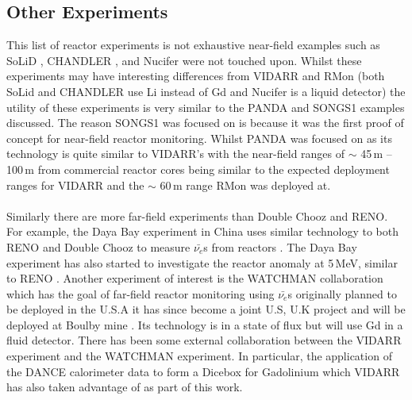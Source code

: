 \subsection{Other Experiments}
This list of reactor experiments is not exhaustive near-field examples such as SoLiD \cite{Solid_readout}, CHANDLER \cite{aap2015}, and Nucifer \cite{nucifer2016} were not touched upon. Whilst these experiments may have interesting differences from VIDARR and RMon (both SoLid and CHANDLER use Li instead of Gd and Nucifer is a liquid detector) the utility of these experiments is very similar to the PANDA and SONGS1 examples discussed. The reason SONGS1 was focused on is because it was the first proof of concept for near-field reactor monitoring. Whilst PANDA was focused on as its technology is quite similar to VIDARR's with the near-field ranges of $\sim$ 45\,m -- 100\,m from commercial reactor cores being similar to the expected deployment ranges for VIDARR and the $\sim$ 60\,m range RMon was deployed at. 
\\\\Similarly there are more far-field experiments than Double Chooz and RENO. For example, the Daya Bay experiment in China uses similar technology to both RENO and Double Chooz to measure $\bar{\nu_e}$s from reactors \cite{DayaBay2007Precision}. The Daya Bay experiment has also started to investigate the reactor anomaly at 5\,MeV, similar to RENO \cite{Daya_Bay_2017}. Another experiment of interest is the WATCHMAN collaboration which has the goal of far-field reactor monitoring using $\bar{\nu_e}$s originally planned to be deployed in the U.S.A \cite{askins2015physics} it has since become a joint U.S, U.K project and will be deployed at Boulby mine \cite{burns2018remote}. Its technology is in a state of flux but will use Gd in a fluid detector. There has been some external collaboration between the VIDARR experiment and the WATCHMAN experiment. In particular, the application of the DANCE calorimeter data to form a Dicebox for Gadolinium which VIDARR has also taken advantage of as part of this work. 



